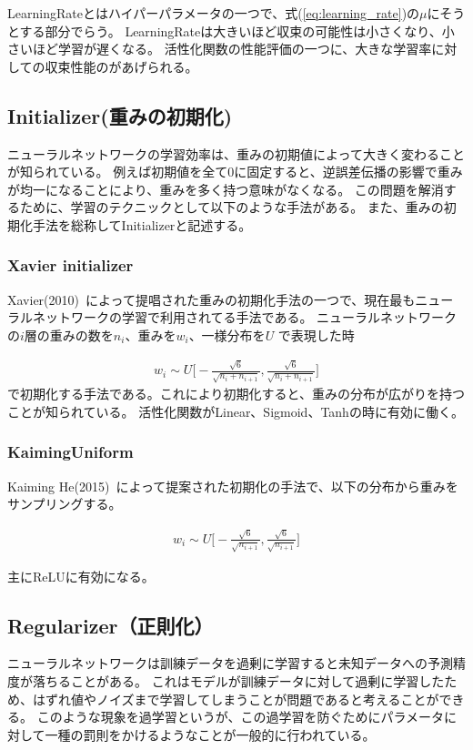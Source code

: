 LearningRateとはハイパーパラメータの一つで、式(\ref{eq:learning_rate})の$ \mu $にそうとする部分でらう。
LearningRateは大きいほど収束の可能性は小さくなり、小さいほど学習が遅くなる。
活性化関数の性能評価の一つに、大きな学習率に対しての収束性能のがあげられる。


\subsection{Initializer(重みの初期化)}
ニューラルネットワークの学習効率は、重みの初期値によって大きく変わることが知られている。
例えば初期値を全て$ 0 $に固定すると、逆誤差伝播の影響で重みが均一になることにより、重みを多く持つ意味がなくなる。
この問題を解消するために、学習のテクニックとして以下のような手法がある。
また、重みの初期化手法を総称してInitializerと記述する。

\subsubsection{Xavier initializer}
Xavier(2010)~\cite{xavier}によって提唱された重みの初期化手法の一つで、現在最もニューラルネットワークの学習で利用されてる手法である。
ニューラルネットワークの$ i $層の重みの数を$ n_{i} $、重みを$ w_i $、一様分布を$U$ で表現した時

\begin{eqnarray}
w_{i} \sim U \bigl[ - \frac{\sqrt{6}}{ \sqrt{n_i + n_{i+1}} }, \frac{\sqrt{6}}{ \sqrt{n_i + n_{i+1} }} \bigr]
\end{eqnarray}
で初期化する手法である。これにより初期化すると、重みの分布が広がりを持つことが知られている。
活性化関数がLinear、Sigmoid、Tanhの時に有効に働く。

\subsubsection{KaimingUniform}
Kaiming He(2015)~\cite{kaiming}によって提案された初期化の手法で、以下の分布から重みをサンプリングする。

\begin{eqnarray}
w_{i} \sim U \bigl[ - \frac{\sqrt{6}}{ \sqrt{n_{i+1}} }, \frac{\sqrt{6}}{ \sqrt{ n_{i+1} }} \bigr]
\end{eqnarray}

主にReLUに有効になる。


\subsection{Regularizer（正則化）}
ニューラルネットワークは訓練データを過剰に学習すると未知データへの予測精度が落ちることがある。
これはモデルが訓練データに対して過剰に学習したため、はずれ値やノイズまで学習してしまうことが問題であると考えることができる。
このような現象を過学習というが、この過学習を防ぐためにパラメータに対して一種の罰則をかけるようなことが一般的に行われている。

